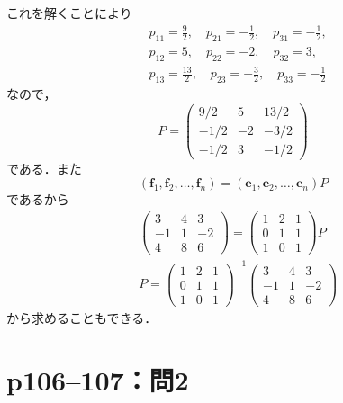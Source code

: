 \documentclass[a4paper,10pt,fleqn]{ltjsarticle}
\begin{document}
\begin{leftbar}
  これを解くことにより
  \begin{align*}
     & p_{11}=\frac{9}{2},\quad p_{21}=-\frac{1}{2},\quad p_{31}=-\frac{1}{2}, \\
     & p_{12}=5,\quad p_{22}=-2,\quad p_{32}=3,                                \\
     & p_{13}=\frac{13}{2},\quad p_{23}=-\frac{3}{2},\quad p_{33}=-\frac{1}{2}
  \end{align*}
  なので，
  \[
    P=
    \begin{pmatrix}
      9/2  & 5  & 13/2 \\
      -1/2 & -2 & -3/2 \\
      -1/2 & 3  & -1/2
    \end{pmatrix}
  \]
  である．また
  \begin{equation*}
    (\bm{f}_1,\bm{f}_2,\ldots ,\bm{f}_n)=(\bm{e}_1,\bm{e}_2,\ldots ,\bm{e}_n)P
  \end{equation*}
  であるから
  \begin{align*}
     &
    \begin{pmatrix}
      3  & 4 & 3  \\
      -1 & 1 & -2 \\
      4  & 8 & 6
    \end{pmatrix}
    =
    \begin{pmatrix}
      1 & 2 & 1 \\
      0 & 1 & 1 \\
      1 & 0 & 1
    \end{pmatrix}
    P     \\
     & P=
    \begin{pmatrix}
      1 & 2 & 1 \\
      0 & 1 & 1 \\
      1 & 0 & 1
    \end{pmatrix}
    ^{-1}
    \begin{pmatrix}
      3  & 4 & 3  \\
      -1 & 1 & -2 \\
      4  & 8 & 6
    \end{pmatrix}
  \end{align*}
  から求めることもできる．
\end{leftbar}

\newpage

\section*{p106--107：問2}
\end{document}
